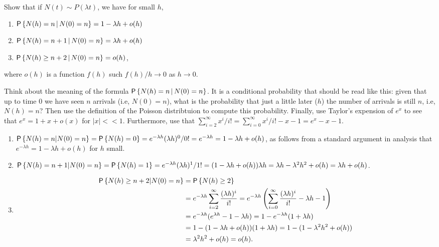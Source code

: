 \begin{exercise}
  Show that if $N(t) \sim P(\lambda t)$, we have for small $h$,
  \begin{enumerate}
  \item $\P{N(h) = n \given N(0) = n} = 1-\lambda h + o(h)$ 
  \item $\P{N(h) = n+1 \given N(0) = n} = \lambda h + o(h)$ 
  \item $\P{N(h) \geq n+2 \given N(0) = n} = o(h)$,
  \end{enumerate}
 where $o(h)$ is a function
    $f(h)$ such $f(h)/h \to 0$ as $h\to 0$.
    \begin{hint}
    Think about the meaning of the formula
      $\P{N(h) = n \given N(0) = n}$. It is a conditional probability
      that should be read like this: given that up to time $0$ we have
      seen $n$ arrivals (i.e, $N(0)=n$), what is the probability that
      just a little later ($h$) the number of arrivals is still $n$,
      i.e, $N(h)=n$? Then use the definition of the Poisson
      distribtuion to compute this probability. Finally, use Taylor's
      expension of $e^{x}$ to see that $e^{x} = 1 +x + o(x)$ for
      $|x| << 1$.  Furthermore, use that
      $\sum_{i=2}^\infty x^i/i! = \sum_{i=0}^\infty x^i/i! - x -1 = e^x -x 
      - 1$.
    \end{hint}
\begin{solution}
\begin{enumerate}
  \item 
  $\P{N(h) = n | N(0) = n} = \P{N(h) = 0} = e^{-\lambda h} (\lambda
  h)^0/0! = e^{-\lambda h} = 1-\lambda h + o(h)$,
  as follows from a standard argument in analysis that
  $e^{-\lambda h} = 1 -\lambda h + o(h)$  for $h$ small. 
\item 
  $\P{N(h) = n +1 | N(0) = n} = \P{N(h) = 1} = e^{-\lambda h} (\lambda h)^1/1! = 
(1-\lambda h + o(h))\lambda h  = \lambda h - \lambda^2 h^2 + o(h) = \lambda h + o(h)$. 
\item 
  \begin{equation*}
    \begin{split}
  \P{N(h) \geq n+2 | N(0) = n} 
&= \P{N(h) \geq 2} \\
&= e^{-\lambda h} \sum_{i=2}^\infty \frac{(\lambda h)^i}{i!} 
= e^{-\lambda h} \left(\sum_{i=0}^\infty \frac{(\lambda h)^i}{i!} - \lambda h - 1\right)\\
&= e^{-\lambda h}(e^{\lambda h} - 1 - \lambda h) 
= 1 - e^{-\lambda h}(1 + \lambda h) \\
&= 1 - (1-\lambda h + o(h))(1+\lambda h) 
= 1 - (1-\lambda^2 h^2 + o(h)) \\
&= \lambda^2 h^2 + o(h) = o(h).
    \end{split}
  \end{equation*}


\end{enumerate}
\end{solution}
\end{exercise}
